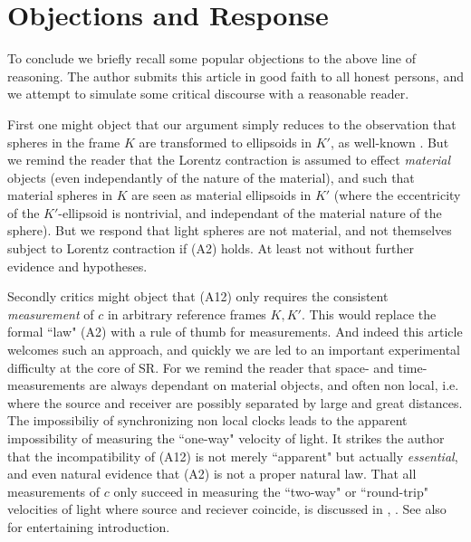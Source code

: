 \documentclass[12pt]{amsart}
\theoremstyle{definition}
\theoremstyle{remark}
\begin{document}
\section{Objections and Response}
To conclude we briefly recall some popular objections to the above line of reasoning. The author submits this article in good faith to all honest persons, and we attempt to simulate some critical discourse with a reasonable reader.

First one might object that our argument simply reduces to the observation that spheres in the frame $K$ are transformed to ellipsoids in $K'$, as well-known \cite[\S 4]{einstein1905electrodynamics}. But we remind the reader that the Lorentz contraction is assumed to effect \emph{material} objects (even independantly of the nature of the material), and such that material spheres in $K$ are seen as material ellipsoids in $K'$ (where the eccentricity of the $K'$-ellipsoid is nontrivial, and independant of the material nature of the sphere). But we respond that light spheres are not material, and not themselves subject to Lorentz contraction if (A2) holds. At least not without further evidence and hypotheses. %

Secondly critics might object that (A12) only requires the consistent \emph{measurement} of $c$ in arbitrary reference frames $K, K'$. This would replace the formal ``law" (A2) with a rule of thumb for measurements. And indeed this article welcomes such an approach, and quickly we are led to an important experimental difficulty at the core of SR. For we remind the reader that space- and time-measurements are always dependant on material objects, and often non local, i.e. where the source and receiver are possibly separated by large and great distances. The impossibiliy of synchronizing non local clocks leads to the apparent impossibility of measuring the ``one-way" velocity of light. It strikes the author that the incompatibility of (A12) is not merely ``apparent" but actually \emph{essential}, and even natural evidence that (A2) is not a proper natural law. That all measurements of $c$ only succeed in measuring the ``two-way" or ``round-trip" velocities of light where source and reciever coincide, is discussed in \cite{zhang1997special}, \cite{israel}. See also \cite{vid} for entertaining introduction.
\end{document}
